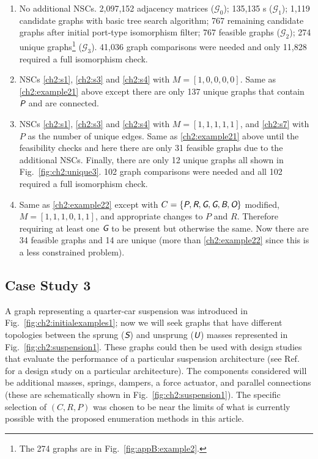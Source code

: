 \begin{enumerate}[nosep]



\item \label{ch2:example21} No additional NSCs. 2,097,152 adjacency matrices ($\mathcal{G}_0$); 135,135 \mypm{}s ($\mathcal{G}_1$); 1,119 candidate graphs with basic tree search algorithm; 767 remaining candidate graphs after initial port-type isomorphism filter; 767 feasible graphs ($\mathcal{G}_2$); 274 unique graphs\footnote{The 274 graphs are in Fig.~\ref{fig:appB:example2}.}
($\mathcal{G}_3$). 41,036 graph comparisons were needed and only 11,828 required a full isomorphism check.

\item NSCs \ref{ch2:s1}, \ref{ch2:s3} and \ref{ch2:s4} with $M=[1, 0, 0, 0, 0]$.  Same as \ref{ch2:example21} above except there are only 137 unique graphs that contain $\textsl{\textsf{P}}$ and are connected.

\item \label{ch2:example22} NSCs \ref{ch2:s1}, \ref{ch2:s3} and \ref{ch2:s4} with $M=[1, 1, 1, 1, 1]$, and \ref{ch2:s7} with $P$ as the number of unique edges. Same as \ref{ch2:example21} above until the feasibility checks and here there are only 31 feasible graphs due to the additional NSCs. Finally, there are only 12 unique graphs all shown in Fig.~\ref{fig:ch2:unique3}. 102 graph comparisons were needed and all 102 required a full isomorphism check.

\item Same as \ref{ch2:example22} except with ${C} = \{ \textsl{\textsf{P}}, \textsl{\textsf{R}}, \textsl{\textsf{G}}, \textsl{\textsf{G}}, \textsl{\textsf{B}}, \textsl{\textsf{O}} \}$ modified, $M=[1, 1, 1, 0, 1, 1]$, and appropriate changes to $P$ and $R$. Therefore requiring at least one $\textsl{\textsf{G}}$ to be present but otherwise the same. Now there are 34 feasible graphs and 14 are unique (more than \ref{ch2:example22} since this is a less constrained problem).

\end{enumerate} 

\subsection{Case Study 3\label{sec:ch2:example4}}



A graph representing a quarter-car suspension was introduced in Fig.~\ref{fig:ch2:initialexamples1}; now we will seek graphs that have different topologies between the sprung ($\textsl{\textsf{S}}$) and unsprung ($\textsl{\textsf{U}}$) masses represented in Fig.~\ref{fig:ch2:suspension1}. These graphs could then be used with design studies that evaluate the performance of a particular suspension architecture (see Ref.~\cite{Allison2014b} for a design study on a particular architecture).
The components considered will be additional masses, springs, dampers, a force actuator, and parallel connections (these are schematically shown in Fig.~\ref{fig:ch2:suspension1}). The specific selection of $(C,R,P)$ was chosen to be near the limits of what is currently possible with the proposed enumeration methods in this article.

